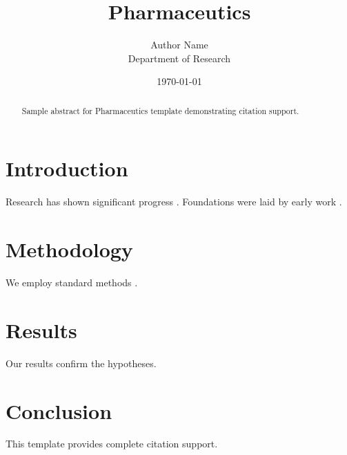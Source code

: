 \documentclass{mdpi}
\title{Pharmaceutics}
\author{Author Name \\ \small Department of Research}
\date{\today}
\begin{document}
\maketitle

\begin{abstract}
Sample abstract for Pharmaceutics template demonstrating citation support.
\end{abstract}

\section{Introduction}
Research has shown significant progress \citep{einstein1905}. Foundations were laid by early work \citep{turing1950}.

\section{Methodology}
We employ standard methods \citep{knuth1984}.

\section{Results}
Our results confirm the hypotheses.

\section{Conclusion}
This template provides complete citation support.



\end{document}
